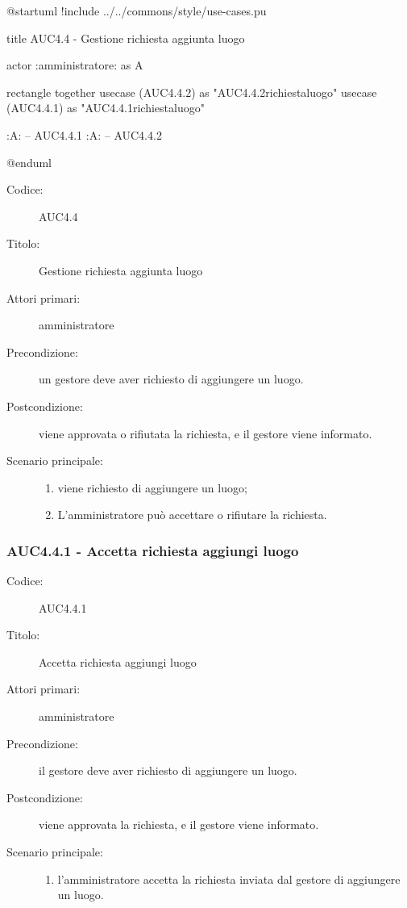 \documentclass[casi-duso]{subfiles}
\begin{document}
\begin{plantuml}
@startuml
!include ../../commons/style/use-cases.pu

title AUC4.4 - Gestione richiesta aggiunta luogo

actor :amministratore: as A

rectangle {
  together {
    usecase (AUC4.4.2) as "AUC4.4.2\nRifiuta richiesta\naggiungi luogo"
    usecase (AUC4.4.1) as "AUC4.4.1\nAccetta richiesta\naggiungi luogo"
  }
}

:A: -- AUC4.4.1
:A: -- AUC4.4.2

@enduml
\end{plantuml}

\begin{description}
  \item[Codice:] AUC4.4
  \item[Titolo:] Gestione richiesta aggiunta luogo
  \item[Attori primari:] amministratore
  \item[Precondizione:] un gestore deve aver richiesto di aggiungere un luogo.
  \item[Postcondizione:] viene approvata o rifiutata la richiesta, e il gestore viene informato.
  \item[Scenario principale:]
  \begin{enumerate}
    \item viene richiesto di aggiungere un luogo;
    \item L'amministratore può accettare o rifiutare la richiesta.
  \end{enumerate}
\end{description}

\subsubsection{AUC4.4.1 - Accetta richiesta aggiungi luogo}%
\label{subsub:AUC4.4.1}
\begin{description}
  \item[Codice:] AUC4.4.1
  \item[Titolo:] Accetta richiesta aggiungi luogo
  \item[Attori primari:] amministratore
  \item[Precondizione:] il gestore deve aver richiesto di aggiungere un luogo.
  \item[Postcondizione:] viene approvata la richiesta, e il gestore viene informato.
  \item[Scenario principale:]
  \begin{enumerate}
    \item  l'amministratore accetta la richiesta inviata dal gestore di aggiungere un luogo.
  \end{enumerate}
\end{description}
\end{document}
